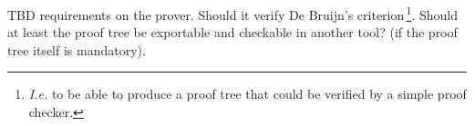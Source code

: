 \documentclass{template/openetcs_article}
\begin{document}
\begin{issue}
TBD requirements on the prover. Should it verify De Bruijn's criterion\,\footnote{\emph{I.e.}
to be able to produce a proof tree that could be verified by a simple proof checker.}.
Should at least the proof tree be exportable and checkable in another tool? (if the proof
tree itself is mandatory).
\end{issue}


\nocite{*}






\end{document}
